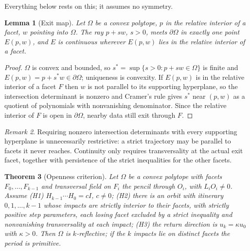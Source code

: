 \documentclass[11pt,a4paper]{article}
\theoremstyle{plain}
\newtheorem{theorem}{Theorem}[section]
\newtheorem{lemma}[theorem]{Lemma}
\theoremstyle{definition}
\theoremstyle{remark}
\newtheorem{remark}[theorem]{Remark}
\begin{document}
Everything below rests on this; it assumes no symmetry.

\begin{lemma}[Exit map]\label{lem:exit}
Let $\Omega$ be a convex polytope, $p$ in the relative interior of a facet, $w$ pointing into
$\Omega$. The ray $p+sw$, $s>0$, meets $\partial\Omega$ in exactly one point $E(p,w)$, and
$E$ is continuous wherever $E(p,w)$ lies in the relative interior of a facet.
\end{lemma}

\begin{proof}
$\Omega$ is convex and bounded, so $s^\ast=\sup\{s>0:p+sw\in\Omega\}$ is finite and
$E(p,w)=p+s^\ast w\in\partial\Omega$; uniqueness is convexity. If $E(p,w)$ is
in the relative interior of a facet $F$ then $w$ is not parallel to its
supporting hyperplane, so the intersection determinant is nonzero and Cramer's
rule gives $s^\ast$ near $(p,w)$ as a quotient of polynomials with nonvanishing
denominator. Since the relative interior of $F$ is open in $\partial\Omega$,
nearby data still exit through $F$.
\end{proof}

\begin{remark}
Requiring nonzero intersection determinants with every supporting hyperplane is unnecessarily restrictive: a strict trajectory may be parallel to facets it never reaches. Continuity only requires transversality at the actual exit facet, together with persistence of the strict inequalities for the other facets.
\end{remark}

\begin{theorem}[Openness criterion]\label{thm:open}
Let $\Omega$ be a convex polytope with facets $F_0,\dots,F_{k-1}$ and transversal
field on $F_i$ the pencil through $O_i$, with $L_iO_i\neq0$. Assume
\textup{(H1)} $H_{k-1}\cdots H_0=cI$, $c\neq0$; \textup{(H2)} there is an orbit
with itinerary $0,1,\dots,k-1$ whose impacts are strictly interior to their facets,
with strictly positive step parameters, each losing facet excluded by a strict
inequality and nonvanishing transversality at each impact; \textup{(H3)} the return
direction is $u_k=\kappa u_0$ with $\kappa>0$. Then $\Omega$ is $k$-reflective; if
the $k$ impacts lie on distinct facets the period is primitive.
\end{theorem}
\end{document}
